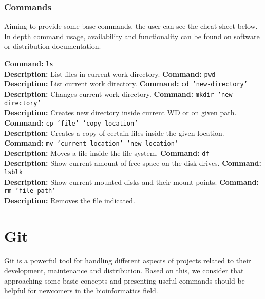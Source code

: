 \documentclass[a4paper,11pt]{article}
\begin{document}
\subsubsection{Commands}
Aiming to provide some base commands, the user can see the cheat sheet below. In
depth command usage, availability and functionality can be found on software or
distribution documentation.
\begin{cheatsheetbox}
\textbf{Command:} \texttt{ls} \\
\textbf{Description:} List files in current work directory.
\noindent\makebox[\linewidth]{\dotfill}
\textbf{Command:} \texttt{pwd} \\
\textbf{Description:} List current work directory.
\noindent\makebox[\linewidth]{\dotfill}
\textbf{Command:} \texttt{cd 'new-directory'} \\
\textbf{Description:} Changes current work directory.
\noindent\makebox[\linewidth]{\dotfill}
\textbf{Command:} \texttt{mkdir 'new-directory'} \\
\textbf{Description:} Creates new directory inside current WD or on given path.
\noindent\makebox[\linewidth]{\dotfill}
\textbf{Command:} \texttt{cp 'file' 'copy-location'} \\
\textbf{Description:} Creates a copy of certain files inside the given 
location.
\noindent\makebox[\linewidth]{\dotfill}
\textbf{Command:} \texttt{mv 'current-location' 'new-location'} \\
\textbf{Description:} Moves a file inside the file system.
\noindent\makebox[\linewidth]{\dotfill}
\textbf{Command:} \texttt{df} \\
\textbf{Description:} Show current amount of free space on the disk drives.
\noindent\makebox[\linewidth]{\dotfill}
\textbf{Command:} \texttt{lsblk} \\
\textbf{Description:} Show current mounted disks and their mount points.
\noindent\makebox[\linewidth]{\dotfill}
\textbf{Command:} \texttt{rm 'file-path'} \\
\textbf{Description:} Removes the file indicated.
\end{cheatsheetbox}

\section{Git}
Git is a powerful tool for handling different aspects of projects related to
their development, maintenance and distribution. Based on this, we consider that
approaching some basic concepts and presenting useful commands should be helpful
for newcomers in the bioinformatics field.
\end{document}
